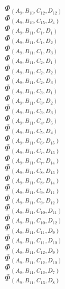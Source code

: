 \documentclass[14pt]{article}
\begin{document}
    $\Phi_{({A}_{9}, {B}_{10}, {C}_{12}, {D}_{12})}$ \\ 
    $\Phi_{({A}_{9}, {B}_{10}, {C}_{15}, {D}_{4})}$ \\ 
    $\Phi_{({A}_{9}, {B}_{11}, {C}_{1}, {D}_{1})}$ \\ 
    $\Phi_{({A}_{9}, {B}_{11}, {C}_{1}, {D}_{2})}$ \\ 
    $\Phi_{({A}_{9}, {B}_{11}, {C}_{1}, {D}_{3})}$ \\ 
    $\Phi_{({A}_{9}, {B}_{11}, {C}_{2}, {D}_{1})}$ \\ 
    $\Phi_{({A}_{9}, {B}_{11}, {C}_{2}, {D}_{2})}$ \\ 
    $\Phi_{({A}_{9}, {B}_{11}, {C}_{2}, {D}_{3})}$ \\ 
    $\Phi_{({A}_{9}, {B}_{11}, {C}_{3}, {D}_{1})}$ \\ 
    $\Phi_{({A}_{9}, {B}_{11}, {C}_{3}, {D}_{2})}$ \\ 
    $\Phi_{({A}_{9}, {B}_{11}, {C}_{3}, {D}_{3})}$ \\ 
    $\Phi_{({A}_{9}, {B}_{11}, {C}_{4}, {D}_{5})}$ \\ 
    $\Phi_{({A}_{9}, {B}_{11}, {C}_{5}, {D}_{4})}$ \\ 
    $\Phi_{({A}_{9}, {B}_{11}, {C}_{6}, {D}_{15})}$ \\ 
    $\Phi_{({A}_{9}, {B}_{11}, {C}_{7}, {D}_{13})}$ \\ 
    $\Phi_{({A}_{9}, {B}_{11}, {C}_{7}, {D}_{14})}$ \\ 
    $\Phi_{({A}_{9}, {B}_{11}, {C}_{8}, {D}_{13})}$ \\ 
    $\Phi_{({A}_{9}, {B}_{11}, {C}_{8}, {D}_{14})}$ \\ 
    $\Phi_{({A}_{9}, {B}_{11}, {C}_{9}, {D}_{11})}$ \\ 
    $\Phi_{({A}_{9}, {B}_{11}, {C}_{9}, {D}_{12})}$ \\ 
    $\Phi_{({A}_{9}, {B}_{11}, {C}_{10}, {D}_{11})}$ \\ 
    $\Phi_{({A}_{9}, {B}_{11}, {C}_{10}, {D}_{12})}$ \\ 
    $\Phi_{({A}_{9}, {B}_{11}, {C}_{11}, {D}_{9})}$ \\ 
    $\Phi_{({A}_{9}, {B}_{11}, {C}_{11}, {D}_{10})}$ \\ 
    $\Phi_{({A}_{9}, {B}_{11}, {C}_{12}, {D}_{9})}$ \\ 
    $\Phi_{({A}_{9}, {B}_{11}, {C}_{12}, {D}_{10})}$ \\ 
    $\Phi_{({A}_{9}, {B}_{11}, {C}_{13}, {D}_{7})}$ \\ 
    $\Phi_{({A}_{9}, {B}_{11}, {C}_{13}, {D}_{8})}$ \\ 
\end{document}
